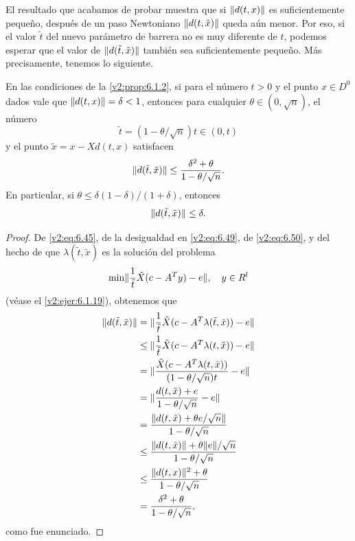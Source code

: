 El resultado que acabamos de probar muestra que si $\lVert d(t, x)\rVert$ es suficientemente pequeño, después de un paso Newtoniano $\lVert d(t, \tilde{x})\rVert$ queda aún menor. Por eso, si el valor $\tilde{t}$ del nuevo parámetro de barrera no es muy diferente de $t$, podemos esperar que el valor de $\lVert d(\tilde{t}, \tilde{x})\rVert$ también sea suficientemente pequeño. Más precisamente, tenemos lo siguiente.

\begin{proposition}\label{v2:prop:6.1.4}
    En las condiciones de la \cref{v2:prop:6.1.2}, si para el número $t > 0$ y el punto $x \in D^0$ dados vale que $\lVert d(t, x)\rVert = \delta < 1$, entonces para cualquier $\theta \in (0, \sqrt{n})$, el número
    \begin{equation}
        \tilde{t} = (1 - \theta / \sqrt{n})t \in (0, t)
        \label{v2:eq:6.50}
    \end{equation}
    y el punto $\tilde{x} = x - Xd(t, x)$ satisfacen
    \[
        \lVert d(\tilde{t}, \tilde{x})\rVert \le \frac{\delta^2 + \theta}{1 - \theta / \sqrt{n}}.
    \]
    En particular, si $\theta \le \delta(1 - \delta) / (1 + \delta)$, entonces
    \[
        \lVert d(\tilde{t}, \tilde{x})\rVert \le \delta.
    \]
\end{proposition}

\begin{proof}
    De \eqref{v2:eq:6.45}, de la desigualdad en \eqref{v2:eq:6.49}, de \eqref{v2:eq:6.50}, y del hecho de que $\lambda(\tilde{t}, \tilde{x})$ es la solución del problema
    \[
        \min \lVert\frac{1}{\tilde{t}} \tilde{X}(c - A^T y) - e\rVert, \quad y \in R^l
    \]
    (véase el \cref{v2:ejer:6.1.19}), obtenemos que
    \begin{align*}
        \lVert d(\tilde{t}, \tilde{x})\rVert &= \lVert\frac{1}{\tilde{t}} \tilde{X}(c - A^T \lambda(\tilde{t}, \tilde{x})) - e\rVert \\
        &\le \lVert\frac{1}{\tilde{t}} \tilde{X}(c - A^T \lambda(t, \tilde{x})) - e\rVert \\
        &= \lVert\frac{\tilde{X}(c - A^T \lambda(t, \tilde{x}))}{(1 - \theta / \sqrt{n})t} - e\rVert \\
        &= \lVert\frac{d(t, \tilde{x}) + e}{1 - \theta / \sqrt{n}} - e\rVert \\
        &= \frac{\lVert d(t, \tilde{x}) + \theta e / \sqrt{n}\rVert}{1 - \theta / \sqrt{n}} \\
        &\le \frac{\lVert d(t, \tilde{x})\rVert + \theta \lVert e\rVert / \sqrt{n}}{1 - \theta / \sqrt{n}} \\
        &\le \frac{\lVert d(t, x)\rVert^2 + \theta}{1 - \theta / \sqrt{n}} \\
        &= \frac{\delta^2 + \theta}{1 - \theta / \sqrt{n}},
    \end{align*}
    como fue enunciado.
\end{proof}

